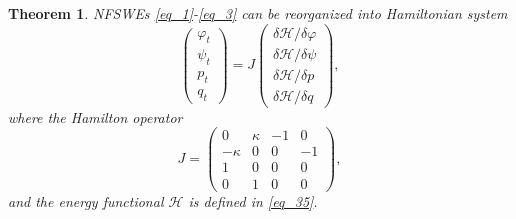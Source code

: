 \documentclass[preprint,compress,3p,10pt,fleqn]{elsarticle}
\numberwithin{equation}{section}
\newtheorem{theorem}{Theorem}[section]
\begin{document}

\begin{theorem}\label{thm2}
	NFSWEs \eqref{eq_1}-\eqref{eq_3} can be reorganized into Hamiltonian system
\begin{equation}\label{eq_37}
	\left(\begin{array}{l}
		\varphi_{t} \\
		\psi_{t} \\
		p_{t} \\
		q_{t}
		\end{array}\right)=J\left(\begin{array}{l}
		\delta \mathcal{H} / \delta \varphi \\
		\delta \mathcal{H} / \delta \psi \\
		\delta \mathcal{H} / \delta p \\
		\delta \mathcal{H} / \delta q
		\end{array}\right),
\end{equation}
where the Hamilton operator
\begin{equation}\label{eq_37b}
J=\left(\begin{array}{cccc}
		0 & \kappa & -1 & 0 \\
		-\kappa & 0 & 0 & -1 \\
		1 & 0 & 0 & 0 \\
		0 & 1 & 0 & 0
		\end{array}\right),
\end{equation}
and the energy functional $\mathcal{H}$ is defined in \eqref{eq_35}.
\end{theorem}
\end{document}
